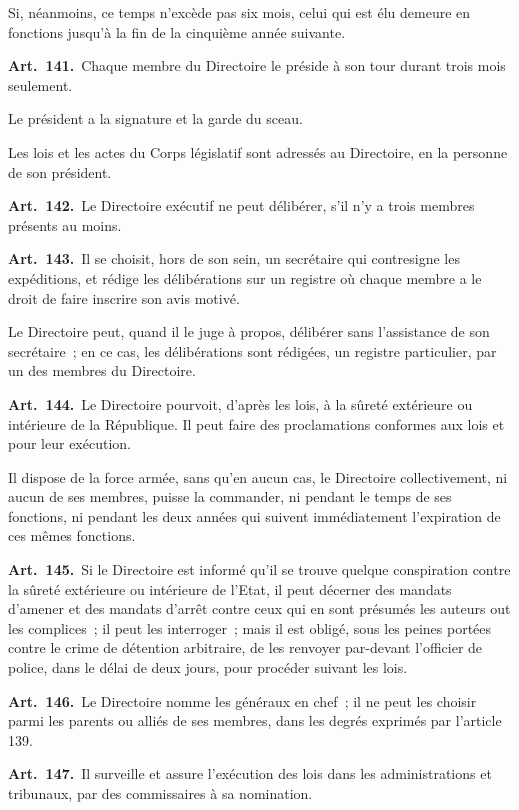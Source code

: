\documentclass[french,twoside]{book} %
\newcommand{\labelchar}[1]{\textbf{\color{rubric} #1}}
\begin{document}
Si, néanmoins, ce temps n’excède pas six mois, celui qui est élu demeure en fonctions jusqu’à la fin de la cinquième année suivante.\par
\labelchar{Art. 141.} Chaque membre du Directoire le préside à son tour durant trois mois seulement.\par
Le président a la signature et la garde du sceau.\par
Les lois et les actes du Corps législatif sont adressés au Directoire, en la personne de son président.\par
\labelchar{Art. 142.} Le Directoire exécutif ne peut délibérer, s’il n’y a trois membres présents au moins.\par
\labelchar{Art. 143.} Il se choisit, hors de son sein, un secrétaire qui contresigne les expéditions, et rédige les délibérations sur un registre où chaque membre a le droit de faire inscrire son avis motivé.\par
Le Directoire peut, quand il le juge à propos, délibérer sans l’assistance de son secrétaire ; en ce cas, les délibérations sont rédigées, un registre particulier, par un des membres du Directoire.\par
\labelchar{Art. 144.} Le Directoire pourvoit, d’après les lois, à la sûreté extérieure ou intérieure de la République. Il peut faire des proclamations conformes aux lois et pour leur exécution.\par
Il dispose de la force armée, sans qu’en aucun cas, le Directoire collectivement, ni aucun de ses membres, puisse la commander, ni pendant le temps de ses fonctions, ni pendant les deux années qui suivent immédiatement l’expiration de ces mêmes fonctions.\par
\labelchar{Art. 145.} Si le Directoire est informé qu’il se trouve quelque conspiration contre la sûreté extérieure ou intérieure de l’Etat, il peut décerner des mandats d’amener et des mandats d’arrêt contre ceux qui en sont présumés les auteurs out les complices ; il peut les interroger ; mais il est obligé, sous les peines portées contre le crime de détention arbitraire, de les renvoyer par-devant l’officier de police, dans le délai de deux jours, pour procéder suivant les lois.\par
\labelchar{Art. 146.} Le Directoire nomme les généraux en chef ; il ne peut les choisir parmi les parents ou alliés de ses membres, dans les degrés exprimés par l’article 139.\par
\labelchar{Art. 147.} Il surveille et assure l’exécution des lois dans les administrations et tribunaux, par des commissaires à sa nomination.\par
\end{document}

